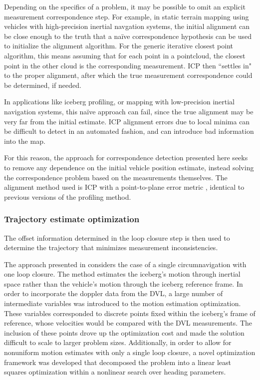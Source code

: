 Depending on the specifics of a problem, it may be possible to omit an explicit measurement correspondence step. For example, in static terrain mapping using vehicles with high-precision inertial navgation systems, the initial alignment can be close enough to the truth that a na\"ive correspondence hypothesis can be used to initialize the alignment algorithm. For the generic iterative closest point algorithm, this means assuming that for each point in a pointcloud, the closest point in the other cloud is the corresponding measurement. ICP then ``settles in" to the proper alignment, after which the true measurement correspondence could be determined, if needed. 

In applications like iceberg profiling, or mapping with low-precision inertial navigation systems, this na\"ive approach can fail, since the true alignment may be very far from the initial estimate. ICP alignment errors due to local minima can be difficult to detect in an automated fashion, and can introduce bad information into the map. 

For this reason, the approach for correspondence detection presented here seeks to remove any dependence on the initial vehicle position estimate, instead solving the correspondence problem based on the measurements themselves. The alignment method used is ICP with a point-to-plane error metric \cite{Gutmann1996}, identical to previous versions of the profiling method. 

\subsubsection{Trajectory estimate optimization}

The offset information determined in the loop closure step is then used to determine the trajectory that minimizes measurement inconsistencies. 

The approach presented in \cite{Kimball2011b} considers the case of a single circumnavigation with one loop closure.  The method estimates the iceberg's motion through inertial space rather than the vehicle's motion through the iceberg reference frame. In order to incorporate the doppler data from the DVL, a large number of intermediate variables was introduced to the motion estimation optimization. These variables corresponded to discrete points fixed within the iceberg's frame of reference, whose velocities would be compared with the DVL measurements. The inclusion of these points drove up the optimization cost and made the solution difficult to scale to larger problem sizes. Additionally, in order to allow for nonuniform motion estimates with only a single loop closure, a novel optimization framework was developed that decomposed the problem into a linear least squares optimization within a nonlinear search over heading parameters.


